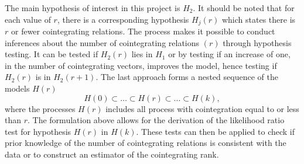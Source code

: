  \noindent The main hypothesis of interest in this project is $H_2$. It should be noted that for each value of $r$, there is a corresponding hypothesis $H_j(r)$ which states there is $r$ or fewer cointegrating relations. 
 \newline
 The process makes it possible to conduct inferences about the number of cointegrating relations $(r)$ through hypothesis testing. It can be tested if $H_2(r)$ lies in $H_1$ or by testing if an increase of one, in the number of cointegrating vectors, improves the model, hence testing if $H_2(r)$ is in $H_2(r+1)$. The last approach forms a nested sequence of the models $H(r)$
\begin{equation*}
    H(0) \subset \dots \subset H(r) \subset \dots \subset H(k),
\end{equation*}
where the processes $H(r)$ includes all process with cointegration equal to or less than $r$. The formulation above allows for the derivation of the likelihood ratio test for hypothesis $H(r)$ in $H(k)$. These tests can then be applied to check if prior knowledge of the number of cointegrating relations is consistent with the data or to construct an estimator of the cointegrating rank.



